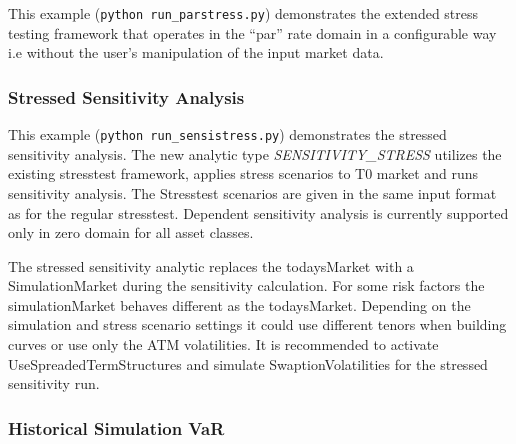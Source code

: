 This example ({\tt python run\_parstress.py}) demonstrates the extended
stress testing framework that operates in the ``par'' rate domain in a configurable way i.e without
the user's manipulation of the input market data.

\subsubsection{Stressed Sensitivity Analysis}
\label{example:marketrisk_sensistress}

This example ({\tt python run\_sensistress.py}) demonstrates the stressed sensitivity analysis. The new analytic type \emph{SENSITIVITY\_STRESS} utilizes the existing stresstest framework, applies stress scenarios to T0 market and runs sensitivity analysis.
The Stresstest scenarios are given in the same input format as for the regular stresstest. Dependent sensitivity analysis is currently supported only in zero domain for all asset classes.

The stressed sensitivity analytic replaces the todaysMarket with a SimulationMarket during the sensitivity calculation. For some risk factors the simulationMarket behaves  different as the todaysMarket.
Depending on the simulation and stress scenario settings it could use different tenors when building curves  or use only the ATM volatilities. It is recommended to activate UseSpreadedTermStructures and simulate SwaptionVolatilities for the stressed sensitivity run.

\subsubsection{Historical Simulation VaR}
\label{example:marketrisk_histsim}

